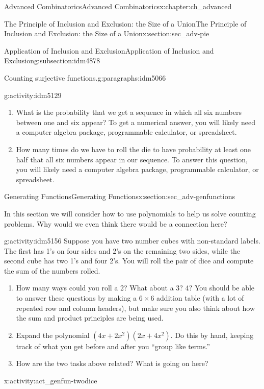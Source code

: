 \documentclass[oneside,10pt,]{book}
\numberwithin{equation}{chapter}
\begin{document}
\begin{chapterptx}{Advanced Combinatorics}{}{Advanced Combinatorics}{}{}{x:chapter:ch_advanced}
\begin{sectionptx}{The Principle of Inclusion and Exclusion: the Size of a Union}{}{The Principle of Inclusion and Exclusion: the Size of a Union}{}{}{x:section:sec_adv-pie}
\begin{subsectionptx}{Application of Inclusion and Exclusion}{}{Application of Inclusion and Exclusion}{}{}{g:subsection:idm4878}
\begin{paragraphs}{Counting surjective functions.}{g:paragraphs:idm5066}
\begin{activity}{}{g:activity:idm5129}
\begin{enumerate}[font=\bfseries,label=(\alph*),ref=\alph*]
\item{}What is the probability that we get a sequence in which all six numbers between one and six appear? To get a numerical answer, you will likely need a computer algebra package, programmable calculator, or spreadsheet.%
\item{}How many times do we have to roll the die to have probability at least one half that all six numbers appear in our sequence. To answer this question, you will likely need a computer algebra package, programmable calculator, or spreadsheet.%
\end{enumerate}
\end{activity}
\end{paragraphs}%
\end{subsectionptx}
\end{sectionptx}
%
%
\typeout{************************************************}
\typeout{************************************************}
%
\begin{sectionptx}{Generating Functions}{}{Generating Functions}{}{}{x:section:sec_adv-genfunctions}
\begin{introduction}{}%
In this section we will consider how to use polynomials to help us solve counting problems.  Why would we even think there would be a connection here?%
\begin{activity}{}{g:activity:idm5156}%
Suppose you have two number cubes with non-standard labels.  The first has 1's on four sides and 2's on the remaining two sides, while the second cube has two 1's and four 2's. You will roll the pair of dice and compute the sum of the numbers rolled.%
\begin{enumerate}[font=\bfseries,label=(\alph*),ref=\alph*]
\item{}How many ways could you roll a 2?  What about a 3?  4?  You should be able to answer these questions by making a \(6\times 6\) addition table (with a lot of repeated row and column headers), but make sure you also think about how the sum and product principles are being used.%
\item{}Expand the polynomial \((4x + 2x^2)(2x + 4x^2)\).  Do this by hand, keeping track of what you get before and after you ``group like terms.''%
\item{}How are the two tasks above related?  What is going on here?%
\end{enumerate}
\end{activity}
\begin{activity}{}{x:activity:act_genfun-twodice}%

\end{activity}
\end{introduction}
\end{sectionptx}
\end{chapterptx}
\end{document}
